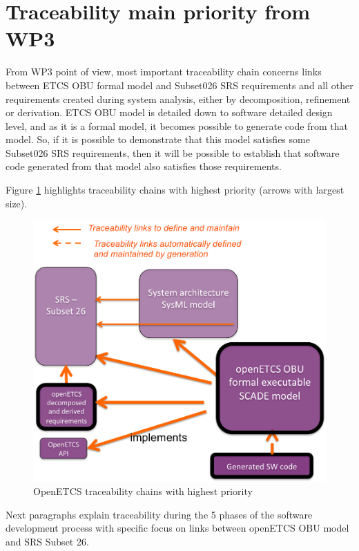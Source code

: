 \documentclass[11pt]{template/openetcs_report}
\begin{document}
\section{Traceability main priority from WP3}
From WP3 point of view, most important traceability chain concerns links between ETCS OBU formal model and Subset026 SRS requirements and all other requirements created during system analysis, either by decomposition, refinement or derivation. 
ETCS OBU model is detailed down to software detailed design level, and as it is a formal model, it becomes possible to generate code from that model. So, if it is possible to demonstrate that this model satisfies some Subset026 SRS requirements, then it will be possible to establish that software code generated from that model also satisfies those requirements.

Figure \ref{fig:openETCSTraceabilityMainPriority} highlights traceability chains with highest priority (arrows with largest size).

\begin{figure}[htb]
\centering
\includegraphics[width=.9\linewidth]
{./images/openETCSTraceabilityMainPriority.png}
\caption{\label{fig:openETCSTraceabilityMainPriority}OpenETCS traceability chains with highest priority}
\end{figure}

Next paragraphs explain traceability during the 5 phases of the software development process with specific focus on links between openETCS OBU model and SRS Subset 26.
\end{document}
